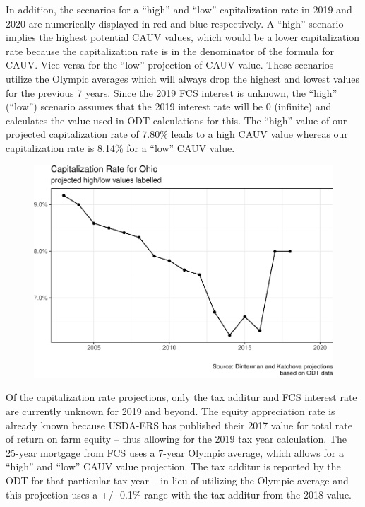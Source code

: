 \documentclass[]{article}
\begin{document}
In addition, the scenarios for a ``high'' and ``low'' capitalization
rate in 2019 and 2020 are numerically displayed in red and blue
respectively. A ``high'' scenario implies the highest potential CAUV
values, which would be a lower capitalization rate because the
capitalization rate is in the denominator of the formula for CAUV.
Vice-versa for the ``low'' projection of CAUV value. These scenarios
utilize the Olympic averages which will always drop the highest and
lowest values for the previous 7 years. Since the 2019 FCS interest is
unknown, the ``high'' (``low'') scenario assumes that the 2019 interest
rate will be 0 (infinite) and calculates the value used in ODT
calculations for this. The ``high'' value of our projected
capitalization rate of 7.80\% leads to a high CAUV value whereas our
capitalization rate is 8.14\% for a ``low'' CAUV value.

\begin{figure}[H]
\includegraphics[width=1\linewidth]{4-projections-2019-2020_files/figure-latex/viz-cap-1} \caption{\label{fig:viz-cap}}\label{fig:viz-cap}
\end{figure}

Of the capitalization rate projections, only the tax additur and FCS
interest rate are currently unknown for 2019 and beyond. The equity
appreciation rate is already known because USDA-ERS has published their
2017 value for total rate of return on farm equity -- thus allowing for
the 2019 tax year calculation. The 25-year mortgage from FCS uses a
7-year Olympic average, which allows for a ``high'' and ``low'' CAUV
value projection. The tax additur is reported by the ODT for that
particular tax year -- in lieu of utilizing the Olympic average and this
projection uses a +/- 0.1\% range with the tax additur from the 2018
value.
\end{document}
